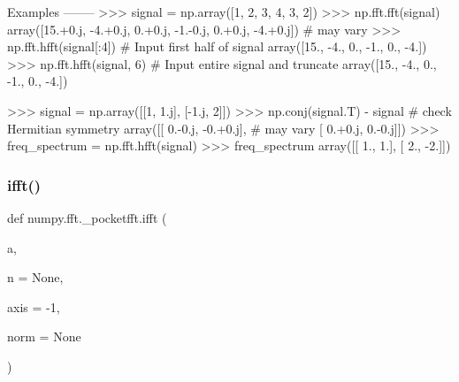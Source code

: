 \begin{DoxyVerb}
Examples
--------
>>> signal = np.array([1, 2, 3, 4, 3, 2])
>>> np.fft.fft(signal)
array([15.+0.j,  -4.+0.j,   0.+0.j,  -1.-0.j,   0.+0.j,  -4.+0.j]) # may vary
>>> np.fft.hfft(signal[:4]) # Input first half of signal
array([15.,  -4.,   0.,  -1.,   0.,  -4.])
>>> np.fft.hfft(signal, 6)  # Input entire signal and truncate
array([15.,  -4.,   0.,  -1.,   0.,  -4.])


>>> signal = np.array([[1, 1.j], [-1.j, 2]])
>>> np.conj(signal.T) - signal   # check Hermitian symmetry
array([[ 0.-0.j,  -0.+0.j], # may vary
       [ 0.+0.j,  0.-0.j]])
>>> freq_spectrum = np.fft.hfft(signal)
>>> freq_spectrum
array([[ 1.,  1.],
       [ 2., -2.]])\end{DoxyVerb}
 \mbox{\label{namespacenumpy_1_1fft_1_1__pocketfft_a4a109df32561e0f5460d773f89cb571d}} 
\subsubsection{\texorpdfstring{ifft()}{ifft()}}
{\footnotesize\ttfamily def numpy.\+fft.\+\_\+pocketfft.\+ifft (\begin{DoxyParamCaption}\item[{}]{a,  }\item[{}]{n = {\ttfamily None},  }\item[{}]{axis = {\ttfamily -\/1},  }\item[{}]{norm = {\ttfamily None} }\end{DoxyParamCaption})}

